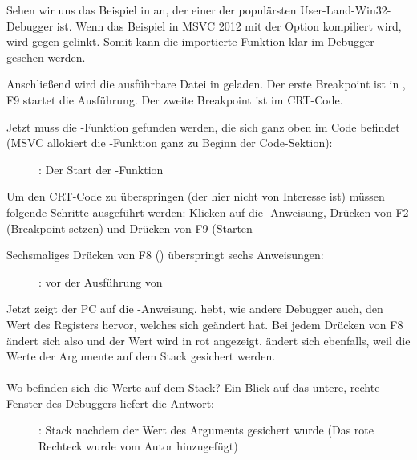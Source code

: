 

\clearpage
{}
\myindex{\olly}

Sehen wir uns das Beispiel in \olly an, der einer der populärsten User-Land-Win32-Debugger ist.
Wenn das Beispiel in MSVC 2012 mit der Option  kompiliert wird, wird gegen  gelinkt.
Somit kann die importierte Funktion klar im Debugger gesehen werden.

Anschließend wird die ausführbare Datei in \olly geladen.
Der erste Breakpoint ist in , F9 startet die Ausführung.
Der zweite Breakpoint ist im \ac{CRT}-Code.

Jetzt muss die \main-Funktion gefunden werden, die sich ganz oben im Code befindet
(MSVC allokiert die \main-Funktion ganz zu Beginn der Code-Sektion): 
\begin{figure}[H]
\centering
{}
\caption{\olly: Der Start der \main-Funktion}
\label{fig:printf3_olly_1}
\end{figure}

Um den \ac{CRT}-Code zu überspringen (der hier nicht von Interesse ist) müssen
folgende Schritte ausgeführt werden: Klicken auf die -Anweisung,
Drücken von F2 (Breakpoint setzen) und Drücken von F9 (Starten

\clearpage
Sechsmaliges Drücken von F8 (\stepover) überspringt sechs Anweisungen:

\begin{figure}[H]
\centering
{}
\caption{\olly: vor der Ausführung von\printf}
\label{fig:printf3_olly_2}
\end{figure}

Jetzt zeigt der \ac{PC} auf die -Anweisung.
\olly hebt, wie andere Debugger auch, den Wert des Registers hervor, welches sich geändert hat.
Bei jedem Drücken von F8 ändert sich also \EIP und der Wert wird in rot angezeigt.
\ESP ändert sich ebenfalls, weil die Werte der Argumente auf dem Stack gesichert werden.\\
\\
Wo befinden sich die Werte auf dem Stack? Ein Blick auf das untere, rechte Fenster
des Debuggers liefert die Antwort:

\begin{figure}[H]
\centering

\caption{\olly: Stack nachdem der Wert des Arguments gesichert wurde (Das rote Rechteck wurde vom Autor hinzugefügt)}
\end{figure}

